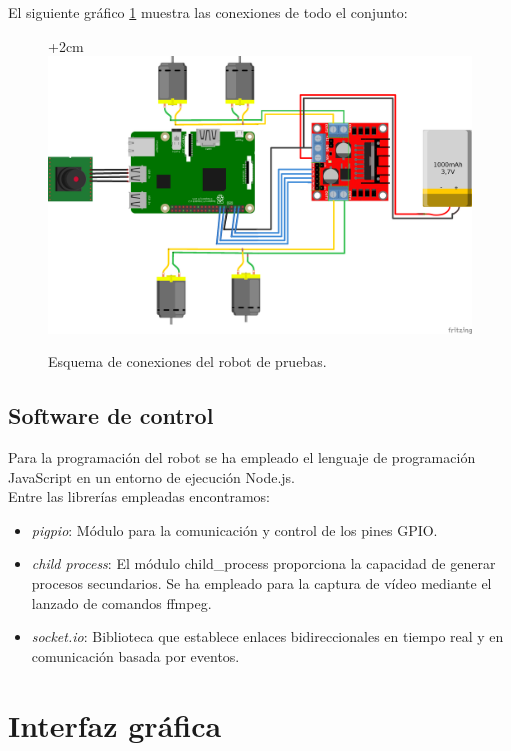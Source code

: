 \documentclass[a4paper,12pt]{article}
\begin{document}
El siguiente gráfico \ref{diagrama:esquema-conexiones} muestra las conexiones de todo el conjunto:

\begin{figure}[H]
  \advance\leftskip+2cm
  \includegraphics[scale=0.4]{imagenes/robot-esquema2.png}
  \caption{Esquema de conexiones del robot de pruebas.}
  \label{diagrama:esquema-conexiones}
\end{figure}


\subsection{Software de control}
  

Para la programación del robot se ha empleado el lenguaje de programación JavaScript en un entorno de ejecución Node.js. \\

Entre las librerías empleadas encontramos:

\begin{itemize}
 \item \emph{pigpio}: Módulo para la comunicación y control de los pines GPIO.
 \item \emph{child process}: El módulo child\_process proporciona la capacidad de generar procesos secundarios. Se ha empleado para la captura de vídeo mediante el lanzado de comandos ffmpeg.
 \item \emph{socket.io}: Biblioteca que establece enlaces bidireccionales en tiempo real y en comunicación basada por eventos.
\end{itemize}


\section{ Interfaz gráfica }
\end{document}
